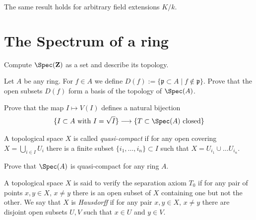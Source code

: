 \begin{remark}
\label{remark-flat-given-residue-field-extension-general}
The same result holds for arbitrary field extensions $K/k$.
\end{remark}










\section{The Spectrum of a ring}
\label{section-spectrum-ring}

\begin{exercise}
\label{exercise-spec-Z}
Compute $\Spec(\mathbf{Z})$ as a set and describe its topology.
\end{exercise}

\begin{exercise}
\label{exercise-basis-opens-standard}
Let $A$ be any ring. For $f\in A$ we define
$D(f):= \{\mathfrak p \subset A \mid f \not \in \mathfrak p\}$.
Prove that the open subsets $D(f)$ form a basis of the topology of
$\Spec(A)$.
\end{exercise}

\begin{exercise}
\label{exercise-radical-ideals-closed}
Prove that the map $I\mapsto V(I)$
defines a natural bijection
$$
\{I\subset A\text{ with }I = \sqrt{I}\}
\longrightarrow
\{T\subset \Spec(A)\text{ closed}\}
$$
\end{exercise}

\begin{definition}
\label{definition-quasi-compact}
A topological space $X$ is called {\it quasi-compact}
if for any open covering $X = \bigcup_{i\in I} U_i$ there is a finite
subset $\{i_1, \ldots, i_n\}\subset I$ such that $X = U_{i_1}\cup\ldots
U_{i_n}$.
\end{definition}

\begin{exercise}
\label{exercise-spec-quasi-compact}
Prove that $\Spec(A)$ is quasi-compact for any ring $A$.
\end{exercise}

\begin{definition}
\label{definition-Hausdorff}
A topological space $X$ is said to verify the separation axiom $T_0$
if for any pair of points $x, y\in X$, $x\not = y$ there is an open
subset of $X$ containing one but not the other.
We say that $X$ is {\it Hausdorff} if for any pair $x, y\in X$, $x\not = y$
there are disjoint open subsets $U, V$ such that $x\in U$
and $y\in V$.
\end{definition}

